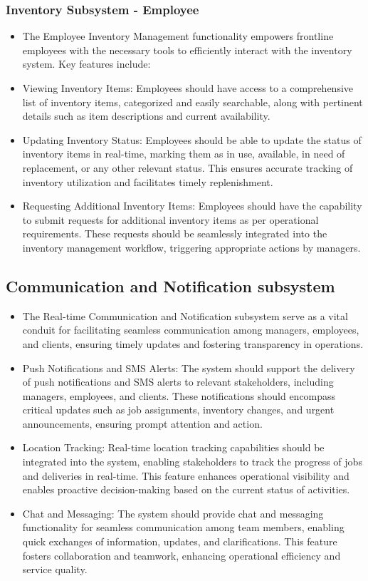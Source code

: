 \documentclass{article}
\begin{document}
	\subsubsection*{Inventory Subsystem - Employee}	
	\begin{itemize}
	    \item The Employee Inventory Management functionality empowers frontline employees with the necessary tools to efficiently interact with the inventory system. Key features include:
	    \item Viewing Inventory Items: Employees should have access to a comprehensive list of inventory items, categorized and easily searchable, along with pertinent details such as item descriptions and current availability.
	    \item Updating Inventory Status: Employees should be able to update the status of inventory items in real-time, marking them as in use, available, in need of replacement, or any other relevant status. This ensures accurate tracking of inventory utilization and facilitates timely replenishment.
	    \item Requesting Additional Inventory Items: Employees should have the capability to submit requests for additional inventory items as per operational requirements. These requests should be seamlessly integrated into the inventory management workflow, triggering appropriate actions by managers.
	\end{itemize}
	\subsection*{Communication and Notification subsystem}	
	\begin{itemize}
	    \item The Real-time Communication and Notification subsystem serve as a vital conduit for facilitating seamless communication among managers, employees, and clients, ensuring timely updates and fostering transparency in operations.
	    \item Push Notifications and SMS Alerts: The system should support the delivery of push notifications and SMS alerts to relevant stakeholders, including managers, employees, and clients. These notifications should encompass critical updates such as job assignments, inventory changes, and urgent announcements, ensuring prompt attention and action.
	    \item Location Tracking: Real-time location tracking capabilities should be integrated into the system, enabling stakeholders to track the progress of jobs and deliveries in real-time. This feature enhances operational visibility and enables proactive decision-making based on the current status of activities.
	    \item Chat and Messaging: The system should provide chat and messaging functionality for seamless communication among team members, enabling quick exchanges of information, updates, and clarifications. This feature fosters collaboration and teamwork, enhancing operational efficiency and service quality.
	\end{itemize}
\end{document}
